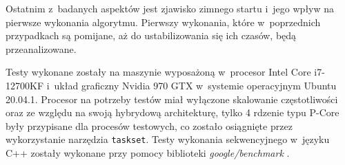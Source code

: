 Ostatnim z~badanych aspektów jest zjawisko zimnego startu i~jego wpływ na pierwsze wykonania algorytmu. Pierwszy wykonania, które w~poprzednich przypadkach są pomijane, aż do ustabilizowania się ich czasów, będą przeanalizowane. 

Testy wykonane zostały na maszynie wyposażoną w~procesor Intel\textsuperscript{\tiny\textregistered} Core\textsuperscript{\tiny\texttrademark} i7-12700KF i~układ graficzny Nvidia 970 GTX w~systemie operacyjnym Ubuntu 20.04.1. Procesor na potrzeby testów miał wyłączone skalowanie częstotliwości oraz ze względu na swoją hybrydową architekturę, tylko 4 rdzenie typu P-Core były przypisane dla procesów testowych, co zostało osiągnięte przez wykorzystanie narzędzia \lstinline{taskset}. Testy wykonania sekwencyjnego w~języku C++ zostały wykonane przy pomocy biblioteki \textit{google/benchmark} \cite{google-benchmark}.
